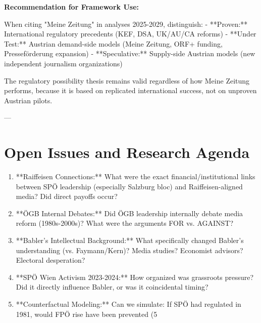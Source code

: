 \textbf{Recommendation for Framework Use:}

When citing "Meine Zeitung" in analyses 2025-2029, distinguish:
- **Proven:** International regulatory precedents (KEF, DSA, UK/AU/CA reforms)
- **Under Test:** Austrian demand-side models (Meine Zeitung, ORF+ funding, Presseförderung expansion)
- **Speculative:** Supply-side Austrian models (new independent journalism organizations)

The regulatory possibility thesis remains valid regardless of how Meine Zeitung performs, because it is based on replicated international success, not on unproven Austrian pilots.

---


\section*{Open Issues and Research Agenda}

\begin{enumerate}
\item **Raiffeisen Connections:** What were the exact financial/institutional links between SPÖ leadership
  (especially Salzburg bloc) and Raiffeisen-aligned media? Did direct payoffs occur?

\item **ÖGB Internal Debates:** Did ÖGB leadership internally debate media reform (1980s-2000s)?
  What were the arguments FOR vs. AGAINST?

\item **Babler's Intellectual Background:** What specifically changed Babler's understanding (vs. Faymann/Kern)?
  Media studies? Economist advisors? Electoral desperation?

\item **SPÖ Wien Activism 2023-2024:** How organized was grassroots pressure? Did it directly influence
  Babler, or was it coincidental timing?

\item **Counterfactual Modeling:** Can we simulate: If SPÖ had regulated in 1981, would FPÖ rise have been
  prevented (5%
\end{enumerate}


